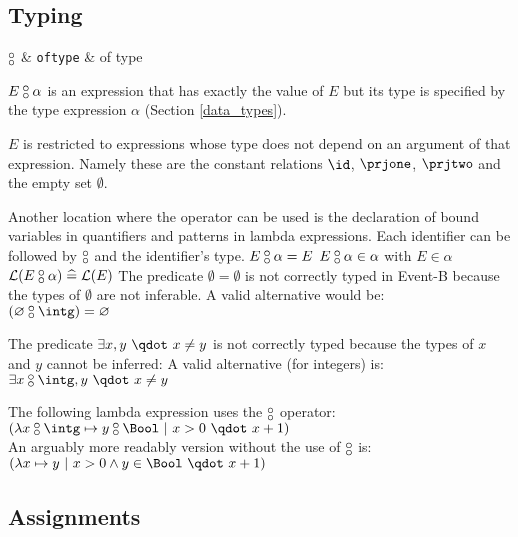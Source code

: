 \subsection{Typing}
\label{typing}
\begin{rrnames}
  $\boftype$      & \texttt{oftype}   & of type
\end{rrnames}
\begin{rodinrefentry}
  \rrdesc
    $E\boftype \alpha$ is an expression that has exactly the value of $E$ but its
    type is specified by the type expression $\alpha$ (Section \ref{data_types}).

    $E$ is restricted to expressions whose type does not depend on an argument of that expression.
    Namely these are the constant relations $\id$, $\prjone$, $\prjtwo$ and the empty set $\emptyset$.

    Another location where the operator can be used is the declaration of bound variables 
    in quantifiers and patterns in lambda expressions.
    Each identifier can be followed by $\boftype$ and the identifier's type.
  \rrdef
    $E\boftype\alpha = E$
  \rrtypes
    $E\boftype\alpha\in\alpha$ with $E\in\alpha$
  \rrwd
    $\wdl(E\boftype\alpha) \defi \wdl(E)$
  \rrex
    The predicate $\emptyset=\emptyset$ is not correctly typed in Event-B because the types
    of $\emptyset$ are not inferable. A valid alternative would be:\\
    $(\emptyset\boftype\intg) = \emptyset$

    The predicate $\exists x,y ~\qdot~ x\neq y$ is not correctly typed because the types of $x$ and $y$
    cannot be inferred: A valid alternative (for integers) is:\\
    $\exists x\boftype\intg,y ~\qdot~ x\neq y$

    The following lambda expression uses the $\boftype$ operator:\\
    $(\lambda x\boftype \intg\mapsto y\boftype\Bool ~|~ x>0 ~\qdot~ x+1)$\\
    An arguably more readably version without the use of $\boftype$ is:\\
    $(\lambda x\mapsto y ~|~ x>0 \land y\in\Bool ~\qdot~ x+1)$
\end{rodinrefentry}


\subsection{Assignments}
\label{assignments}

